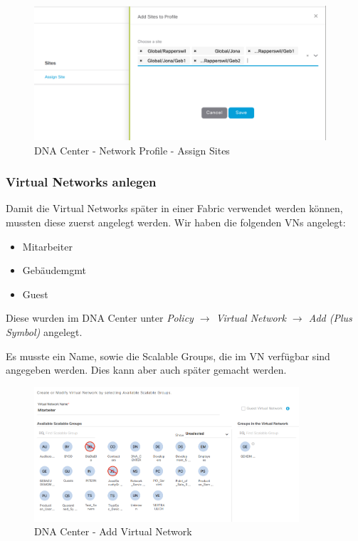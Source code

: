 \begin{figure}[H]
	\centering
	\includegraphics[height=5cm]{img/secondtry/dna-center-network-profile-assign-sites.png}
	\caption{DNA Center - Network Profile - Assign Sites}
	\label{fig:dna-center-network-profile-assign-sites}
\end{figure}

\subsubsection{Virtual Networks anlegen}

Damit die Virtual Networks später in einer Fabric verwendet werden können, mussten diese zuerst angelegt werden. Wir haben die folgenden VNs angelegt:
\begin{itemize}
	\item Mitarbeiter
	\item Gebäudemgmt
	\item Guest
\end{itemize}

Diese wurden im DNA Center unter \textit{Policy $\rightarrow$ Virtual Network $\rightarrow$ Add (Plus Symbol)} angelegt.

Es musste ein Name, sowie die Scalable Groups, die im VN verfügbar sind angegeben werden. Dies kann aber auch später gemacht werden.

\begin{figure}[H]
	\centering
	\includegraphics[height=5cm]{img/secondtry/dna-center-add-vn.png}
	\caption{DNA Center - Add Virtual Network}
	\label{fig:dna-center-add-vn}
\end{figure}

